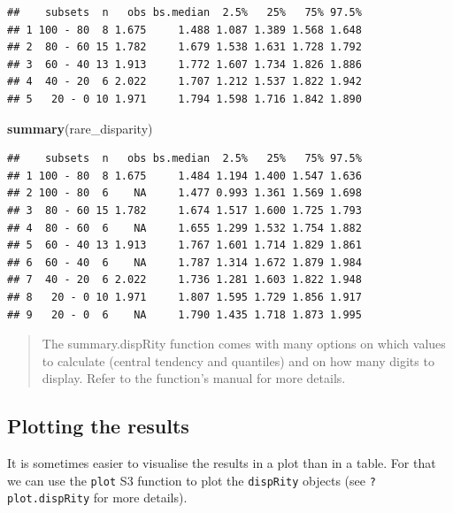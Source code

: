 \documentclass[]{book}
\newenvironment{Shaded}{\begin{snugshade}}{\end{snugshade}}
\newcommand{\KeywordTok}[1]{\textcolor[rgb]{0.13,0.29,0.53}{\textbf{#1}}}
\newcommand{\NormalTok}[1]{#1}
\theoremstyle{definition}
\theoremstyle{definition}
\theoremstyle{remark}
\begin{document}
\begin{verbatim}
##    subsets  n   obs bs.median  2.5%   25%   75% 97.5%
## 1 100 - 80  8 1.675     1.488 1.087 1.389 1.568 1.648
## 2  80 - 60 15 1.782     1.679 1.538 1.631 1.728 1.792
## 3  60 - 40 13 1.913     1.772 1.607 1.734 1.826 1.886
## 4  40 - 20  6 2.022     1.707 1.212 1.537 1.822 1.942
## 5   20 - 0 10 1.971     1.794 1.598 1.716 1.842 1.890
\end{verbatim}

\begin{Shaded}
\begin{Highlighting}[]
\KeywordTok{summary}\NormalTok{(rare_disparity)}
\end{Highlighting}
\end{Shaded}

\begin{verbatim}
##    subsets  n   obs bs.median  2.5%   25%   75% 97.5%
## 1 100 - 80  8 1.675     1.484 1.194 1.400 1.547 1.636
## 2 100 - 80  6    NA     1.477 0.993 1.361 1.569 1.698
## 3  80 - 60 15 1.782     1.674 1.517 1.600 1.725 1.793
## 4  80 - 60  6    NA     1.655 1.299 1.532 1.754 1.882
## 5  60 - 40 13 1.913     1.767 1.601 1.714 1.829 1.861
## 6  60 - 40  6    NA     1.787 1.314 1.672 1.879 1.984
## 7  40 - 20  6 2.022     1.736 1.281 1.603 1.822 1.948
## 8   20 - 0 10 1.971     1.807 1.595 1.729 1.856 1.917
## 9   20 - 0  6    NA     1.790 1.435 1.718 1.873 1.995
\end{verbatim}

\begin{quote}
The summary.dispRity function comes with many options on which values to
calculate (central tendency and quantiles) and on how many digits to
display. Refer to the function's manual for more details.
\end{quote}

\subsection{Plotting the results}\label{plotting-the-results}

It is sometimes easier to visualise the results in a plot than in a
table. For that we can use the \texttt{plot} S3 function to plot the
\texttt{dispRity} objects (see \texttt{?plot.dispRity} for more
details).
\end{document}
